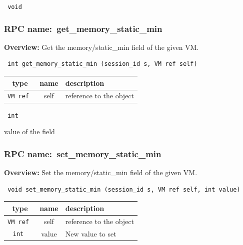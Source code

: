 \vspace{0.3cm}

{\tt 
void
}



\vspace{0.3cm}
\vspace{0.3cm}
\vspace{0.3cm}
\subsubsection{RPC name:~get\_memory\_static\_min}

{\bf Overview:} 
Get the memory/static\_min field of the given VM.

\begin{verbatim} int get_memory_static_min (session_id s, VM ref self)\end{verbatim}



 
\vspace{0.3cm}
\begin{tabular}{|c|c|p{7cm}|}
 \hline
{\bf type} & {\bf name} & {\bf description} \\ \hline
{\tt VM ref } & self & reference to the object \\ \hline 

\end{tabular}

\vspace{0.3cm}

{\tt 
int
}


value of the field
\vspace{0.3cm}
\vspace{0.3cm}
\vspace{0.3cm}
\subsubsection{RPC name:~set\_memory\_static\_min}

{\bf Overview:} 
Set the memory/static\_min field of the given VM.

\begin{verbatim} void set_memory_static_min (session_id s, VM ref self, int value)\end{verbatim}



 
\vspace{0.3cm}
\begin{tabular}{|c|c|p{7cm}|}
 \hline
{\bf type} & {\bf name} & {\bf description} \\ \hline
{\tt VM ref } & self & reference to the object \\ \hline 

{\tt int } & value & New value to set \\ \hline 

\end{tabular}

